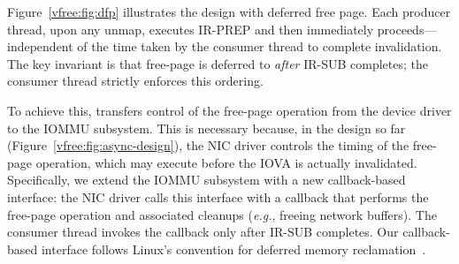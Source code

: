 Figure~\ref{vfree:fig:dfp} illustrates the {\vfreename} design with deferred free page.
Each producer thread, upon any unmap, executes IR-PREP and then immediately proceeds---independent of the time taken by the consumer thread to complete invalidation.
The key invariant is that free-page is deferred to {\it after} IR-SUB completes;
the consumer thread strictly enforces this ordering.

To achieve this, {\vfreename} transfers control of the free-page operation from the device driver to the IOMMU subsystem.
This is necessary because, in the design so far (Figure~\ref{vfree:fig:async-design}),
the NIC driver controls the timing of the free-page operation, which may execute before the IOVA is actually invalidated.
Specifically, we extend the IOMMU subsystem with a new callback-based  interface:
the NIC driver calls this interface with a callback that performs the free-page operation 
    and associated cleanups (\textit{e.g.}, freeing network buffers).
The consumer thread invokes the callback only after IR-SUB completes.
Our callback-based interface follows Linux's  convention for deferred memory 
    reclamation~\cite{linux_rcu,linux_ma_free_rcu, linux_kfence_free, linux_tlb_remove_table_free}.

